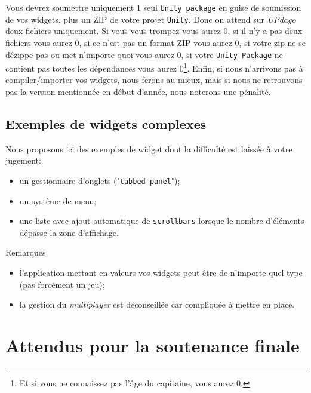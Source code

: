 \documentclass[a4paper,10pt]{article}
\begin{document}
Vous devrez soumettre uniquement 1 seul \texttt{Unity package} en guise de soumission de vos widgets, plus un ZIP de votre projet \texttt{Unity}. Donc on attend sur \textit{UPdago} deux fichiers uniquement. Si vous vous trompez vous aurez 0, si il n'y a pas deux fichiers vous aurez 0, si ce n'est pas un format ZIP vous aurez 0, si votre zip ne se dézippe pas ou met n'importe quoi vous aurez 0, si votre \texttt{Unity Package} ne contient pas toutes les dépendances vous aurez 0\footnote{Et si vous ne connaissez pas l'âge du capitaine, vous aurez 0.}. Enfin, si nous n'arrivons pas à compiler/importer vos widgets, nous ferons au mieux, mais si nous ne retrouvons pas la version mentionnée en début d'année, nous noterons une pénalité.

\subsection{Exemples de widgets complexes}

Nous proposons ici des exemples de widget dont la difficulté est laissée à votre jugement:
\begin{itemize}
	\item un gestionnaire d'onglets ("\texttt{tabbed panel}");
	\item un système de menu;
	\item une liste avec ajout automatique de \texttt{scrollbars} lorsque le nombre d'éléments dépasse la zone d'affichage.
\end{itemize}

Remarques
\begin{itemize}
	\item  l'application mettant en valeurs vos widgets peut être de n'importe quel type (pas forcément un jeu);
	\item la gestion du \textit{multiplayer} est déconseillée car compliquée à mettre en place.
	
\end{itemize}

\section{Attendus pour la soutenance finale}
\end{document}
